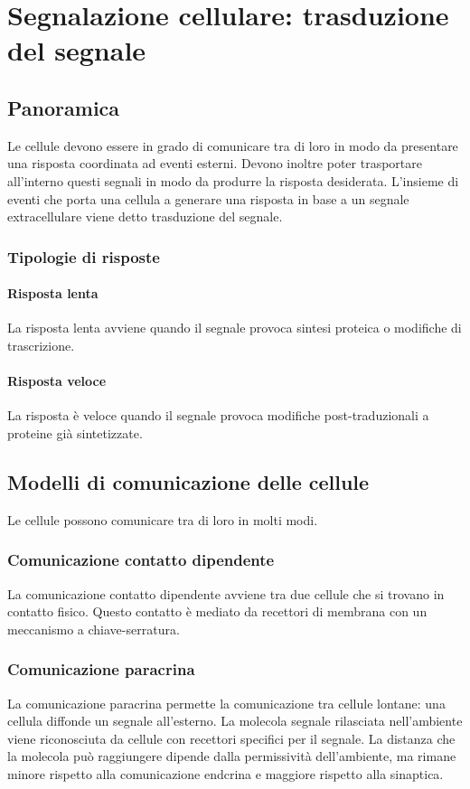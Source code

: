 \chapter{Segnalazione cellulare: trasduzione del segnale}

\section{Panoramica}
Le cellule devono essere in grado di comunicare tra di loro in modo da presentare una risposta coordinata ad eventi esterni.
Devono inoltre poter trasportare all'interno questi segnali in modo da produrre la risposta desiderata.
L'insieme di eventi che porta una cellula a generare una risposta in base a un segnale extracellulare viene detto trasduzione del segnale.

	\subsection{Tipologie di risposte}

		\subsubsection{Risposta lenta}
		La risposta lenta avviene quando il segnale provoca sintesi proteica o modifiche di trascrizione.

		\subsubsection{Risposta veloce}
		La risposta \`e veloce quando il segnale provoca modifiche post-traduzionali a proteine gi\`a sintetizzate.

\section{Modelli di comunicazione delle cellule}
Le cellule possono comunicare tra di loro in molti modi.

	\subsection{Comunicazione contatto dipendente}
	La comunicazione contatto dipendente avviene tra due cellule che si trovano in contatto fisico.
	Questo contatto \`e mediato da recettori di membrana con un meccanismo a chiave-serratura.

	\subsection{Comunicazione paracrina}
	La comunicazione paracrina permette la comunicazione tra cellule lontane: una cellula diffonde un segnale all'esterno.
	La molecola segnale rilasciata nell'ambiente viene riconosciuta da cellule con recettori specifici per il segnale.
	La distanza che la molecola pu\`o raggiungere dipende dalla permissivit\`a dell'ambiente, ma rimane minore rispetto alla comunicazione endcrina e maggiore rispetto alla sinaptica.

